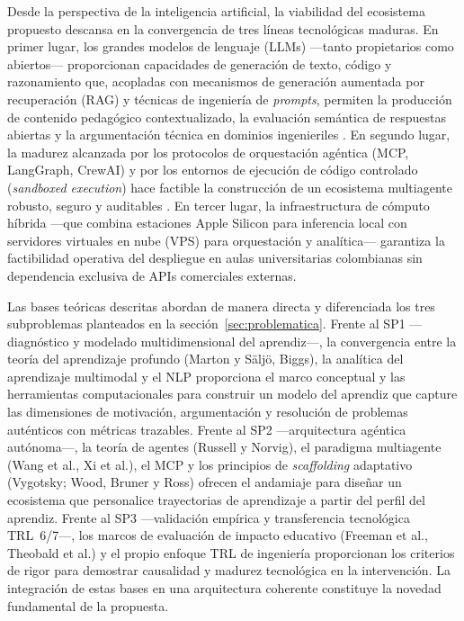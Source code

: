 Desde la perspectiva de la inteligencia artificial, la viabilidad del ecosistema
propuesto descansa en la convergencia de tres líneas tecnológicas maduras. En primer
lugar, los grandes modelos de lenguaje (LLMs) —tanto propietarios como abiertos—
proporcionan capacidades de generación de texto, código y razonamiento que, acopladas
con mecanismos de generación aumentada por recuperación (RAG) y 
técnicas de ingeniería de \emph{prompts}, permiten la producción de contenido
pedagógico contextualizado, la evaluación semántica de respuestas abiertas y la
 argumentación técnica en dominios ingenieriles \cite{park2023generative,
singhal2024large}. En segundo lugar, la madurez alcanzada por los protocolos de
orquestación agéntica (MCP, LangGraph, CrewAI) y por los entornos de ejecución de
código controlado (\emph{sandboxed execution}) hace factible la construcción de un
ecosistema multiagente robusto, seguro y auditables \cite{xi2023rise}. En tercer
lugar, la infraestructura de cómputo híbrida —que combina estaciones Apple Silicon
para inferencia local con servidores virtuales en nube (VPS) para orquestación y
analítica— garantiza la factibilidad operativa del despliegue en aulas universitarias
colombianas sin dependencia exclusiva de APIs comerciales externas.

Las bases teóricas descritas abordan de manera directa y diferenciada los tres
subproblemas planteados en la sección~\ref{sec:problematica}. Frente al SP1
—diagnóstico y modelado multidimensional del aprendiz—, la convergencia entre la
teoría del aprendizaje profundo (Marton y Säljö, Biggs), la analítica del aprendizaje
multimodal y el NLP proporciona el marco conceptual y las herramientas computacionales
para construir un modelo del aprendiz que capture las dimensiones de motivación,
argumentación y resolución de problemas auténticos con métricas trazables. Frente al
SP2 —arquitectura agéntica autónoma—, la teoría de agentes (Russell y Norvig), el
paradigma multiagente (Wang et al., Xi et al.), el MCP y los principios de
\emph{scaffolding} adaptativo (Vygotsky; Wood, Bruner y Ross) ofrecen el andamiaje
para diseñar un ecosistema que personalice trayectorias de aprendizaje a partir del
perfil del aprendiz. Frente al SP3 —validación empírica y transferencia tecnológica
TRL~6/7—, los marcos de evaluación de impacto educativo (Freeman et al., Theobald et
al.) y el propio enfoque TRL de ingeniería proporcionan los criterios de rigor para
demostrar causalidad y madurez tecnológica en la intervención. La integración de
estas bases en una arquitectura coherente constituye la novedad fundamental de la
propuesta.

